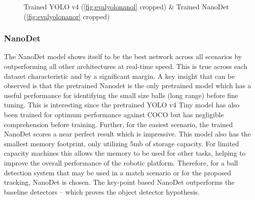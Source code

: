 \documentclass[a4paper,twoside,12pt]{report}
\begin{document}
\begin{figure}[h!]
    \centering
    \qquad
    \caption{Trained YOLO v4 (\ref{fig:evalyolonanol} cropped) \& Trained NanoDet (\ref{fig:evalyolonanor} cropped)}
\end{figure}

\subsubsection{NanoDet}

The NanoDet model shows itself to be the best network across all scenarios by outperforming all other architectures at real-time speed. This is true across each dataset characteristic and by a significant margin. A key insight that can be observed is that the pretrained Nanodet is the only pretrained model which has a useful performance for identifying the small size balls (long range) before fine tuning. This is interesting since the pretrained YOLO v4 Tiny model has also been trained for optimum performance against COCO but has negligible comprehension before training. Further, for the easiest scenario, the trained NanoDet scores a near perfect result which is impressive. This model also has the smallest memory footprint, only utilizing 5mb of storage capacity. For limited capacity machines this allows the memory to be used for other tasks, helping to improve the overall performance of the robotic platform. Therefore, for a ball detection system that may be used in a match scenario or for the proposed tracking, NanoDet is chosen. The key-point based NanoDet outperforms the baseline detectors -- which proves the object detector hypothesis.
\end{document}
